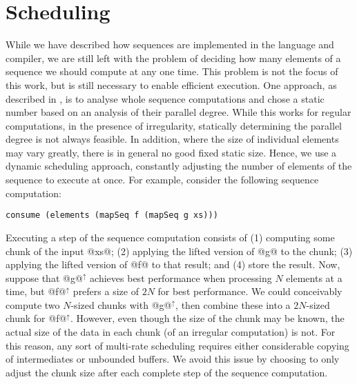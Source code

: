 \section{Scheduling}
\label{sec:scheduling}

While we have described how sequences are implemented in the language and compiler, we are still left with the problem of deciding how many elements of a sequence we should compute at any one time. This problem is not the focus of this work, but is still necessary to enable efficient execution. One approach, as described in \citet{Madsen:2015}, is to analyse whole sequence computations and chose a static number based on an analysis of their parallel
degree. While this works for regular computations, in the presence of
irregularity, statically determining the parallel degree is not always feasible. In addition, where the size of individual elements may vary greatly, there is
in general no good fixed static size. Hence, we use a dynamic scheduling
approach, constantly adjusting the number of elements of the sequence to execute
at once.
For example, consider the following sequence computation:
%
\begin{lstlisting}
consume (elements (mapSeq f (mapSeq g xs)))
\end{lstlisting}
%
Executing a step of the sequence computation consists of (1) computing some
chunk of the input @xs@; (2) applying the lifted version of @g@ to the chunk; (3) applying the lifted version of @f@ to that result; and (4) store the result. Now, suppose that @g@$^\uparrow$ achieves best performance when processing $N$ elements at a
time, but @f@$^\uparrow$ prefers a size of $2N$ for best performance. We could
conceivably compute two $N$-sized chunks with @g@$^\uparrow$, then combine these
into a $2N$-sized chunk for @f@$^\uparrow$. However, even though the size of the
chunk may be known, the actual size of the data in each chunk (of an irregular
computation) is not. For this reason, any sort of multi-rate scheduling requires
either considerable copying of intermediates or unbounded buffers. We avoid this
issue by choosing to only adjust the chunk size after each complete step of the
sequence computation.

